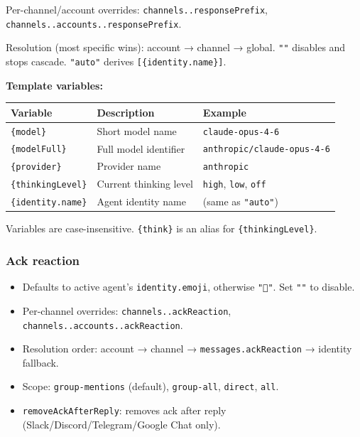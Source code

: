 Per-channel/account overrides: \texttt{channels..responsePrefix}, \texttt{channels..accounts..responsePrefix}.

Resolution (most specific wins): account → channel → global. \texttt{""} disables and stops cascade. \texttt{"auto"} derives \texttt{[\{identity.name\}]}.

\textbf{Template variables:}


\begin{table}[h]
\centering
\small
\begin{tabular}{|l|l|l|}
\hline
Variable & Description & Example \\
\hline
\texttt{\{model\}} & Short model name & \texttt{claude-opus-4-6} \\
\hline
\texttt{\{modelFull\}} & Full model identifier & \texttt{anthropic/claude-opus-4-6} \\
\hline
\texttt{\{provider\}} & Provider name & \texttt{anthropic} \\
\hline
\texttt{\{thinkingLevel\}} & Current thinking level & \texttt{high}, \texttt{low}, \texttt{off} \\
\hline
\texttt{\{identity.name\}} & Agent identity name & (same as \texttt{"auto"}) \\
\hline
\end{tabular}
\end{table}



Variables are case-insensitive. \texttt{\{think\}} is an alias for \texttt{\{thinkingLevel\}}.

\subsubsection{Ack reaction}


\begin{itemize}
  \item Defaults to active agent's \texttt{identity.emoji}, otherwise \texttt{"👀"}. Set \texttt{""} to disable.
  \item Per-channel overrides: \texttt{channels..ackReaction}, \texttt{channels..accounts..ackReaction}.
  \item Resolution order: account → channel → \texttt{messages.ackReaction} → identity fallback.
  \item Scope: \texttt{group-mentions} (default), \texttt{group-all}, \texttt{direct}, \texttt{all}.
  \item \texttt{removeAckAfterReply}: removes ack after reply (Slack/Discord/Telegram/Google Chat only).
\end{itemize}


